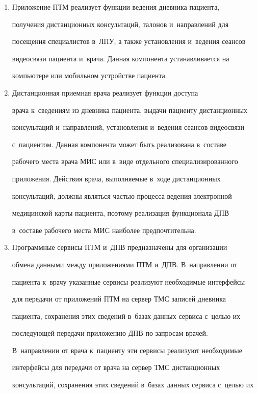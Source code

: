   \begin{enumerate}[1.]


\item Приложение ПТМ реализует функции ведения дневника пациента, 


получения дистанционных консультаций, талонов и~направлений для 


посещения специалистов в~ЛПУ, а также установления и~ведения сеансов 


видеосвязи пациента и~врача. Данная компонента устанавливается на 


компьютере или мобильном устройстве пациента.


\item Дистанционная приемная врача  реализует функции доступа 


врача к~сведениям из дневника пациента, выдачи пациенту дистанционных 


консультаций и~направлений, установления и~ведения сеансов видеосвязи 


с~пациентом. Данная компонента может быть реализована в~составе 


рабочего места врача МИС или в~виде отдельного специализированного 


приложения. Действия врача, выполняемые в~ходе дистанционных 


консультаций, должны являться частью процесса ведения электронной 


медицинской карты пациента, поэтому реализация функционала ДПВ 


в~составе рабочего места МИС наиболее предпочтительна.


\item  Программные сервисы ПТМ и~ДПВ предназначены для организации 


обмена данными между приложениями ПТМ и~ДПВ. В~направлении от 


пациента к~врачу указанные сервисы реализуют необходимые интерфейсы 


для передачи от приложений ПТМ на сервер ТМС записей дневника 


пациента, сохранения этих сведений в~базах данных сервиса с~целью их 


последующей передачи приложению ДПВ по запросам врачей. 


В~направлении от врача к~пациенту эти сервисы реализуют необходимые 


интерфейсы для передачи от врача на сервер ТМС дистанционных 


консультаций, сохранения этих сведений в~базах данных сервиса с~целью их 



\end{enumerate}
